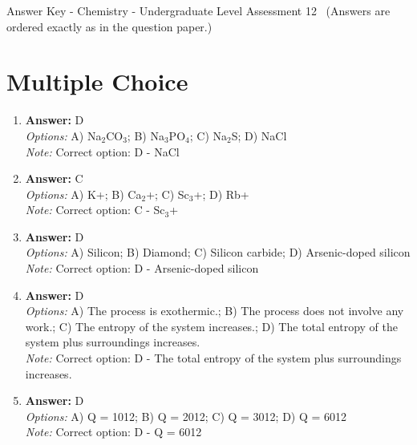 \documentclass[12pt]{article}
\begin{document}
\begin{center}
Answer Key - Chemistry - Undergraduate Level Assessment 12 \
\small (Answers are ordered exactly as in the question paper.)
\end{center}

\section*{Multiple Choice}
\begin{enumerate}[label=\arabic*.]
\item \textbf{Answer:} D
\\ \textit{Options:} A) Na$_{2}$CO$_{3}$; B) Na$_{3}$PO$_{4}$; C) Na$_{2}$S; D) NaCl
\\ \textit{Note:} Correct option: D - NaCl
\item \textbf{Answer:} C
\\ \textit{Options:} A) K+; B) Ca$_{2}$+; C) Sc$_{3}$+; D) Rb+
\\ \textit{Note:} Correct option: C - Sc$_{3}$+
\item \textbf{Answer:} D
\\ \textit{Options:} A) Silicon; B) Diamond; C) Silicon carbide; D) Arsenic-doped silicon
\\ \textit{Note:} Correct option: D - Arsenic-doped silicon
\item \textbf{Answer:} D
\\ \textit{Options:} A) The process is exothermic.; B) The process does not involve any work.; C) The entropy of the system increases.; D) The total entropy of the system plus surroundings increases.
\\ \textit{Note:} Correct option: D - The total entropy of the system plus surroundings increases.
\item \textbf{Answer:} D
\\ \textit{Options:} A) Q = 1012; B) Q = 2012; C) Q = 3012; D) Q = 6012
\\ \textit{Note:} Correct option: D - Q = 6012
\end{enumerate}
\end{document}
